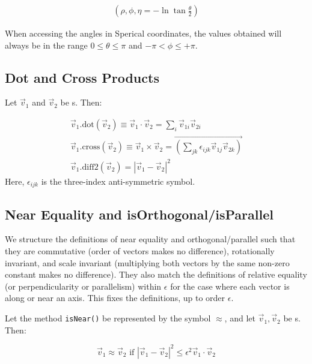 \begin{eqnarray}
  \left( \rho, \phi, \eta = - \ln { \tan { \frac {\theta}{2} } } \right)
  \label{eq:spherical}
\end{eqnarray}

When accessing the angles in Sperical coordinates, the values obtained will
always be in the range  $0 \leq \theta \leq \pi$ and $-\pi < \phi \leq +\pi$. 


\subsection {Dot and Cross Products}

\noindent
Let $\vec{v}_{1}$ and $\vec{v}_{2}$ be \SV s.  Then:

\begin{eqnarray}
  \vec{v}_{1}.\mbox{dot} (\vec{v}_{2}) \equiv
    \vec{v}_{1} \cdot \vec{v}_{2} = \sum_{i} \vec{v}_{1i} \vec{v}_{2i}
    \label{eq:dot} \\
  \vec{v}_{1}.\mbox{cross} (\vec{v}_{2}) \equiv
    \vec{v}_{1} \times \vec{v}_{2} = \stackrel{\longrightarrow} 
	{ {\textstyle \left( 
		\sum_{jk} \epsilon_{ijk} \vec{v}_{1j} \vec{v}_{2k} \right) } }
    \label{eq:cross} \\
  \vec{v}_{1}.\mbox{diff2} (\vec{v}_{2}) =
    \left| \vec{v}_{1} - \vec{v}_{2} \right| ^ 2 \label{eq:diff2}
\end{eqnarray}
\noindent
Here, $\epsilon_{ijk}$ is the three-index anti-symmetric symbol.


\subsection {Near Equality and isOrthogonal/isParallel}

\noindent
We structure the definitions of near equality and orthogonal/parallel such that
they are commutative (order of vectors makes no difference), rotationally
invariant, and scale invariant (multiplying both vectors by the same non-zero
constant makes no difference).  They also match the definitions of relative
equality (or perpendicularity or parallelism) within $\epsilon$ for the case
where each vector is along or near an axis.  This fixes the definitions, up to
order $\epsilon$.

\noindent
Let the method {\tt isNear()} be represented by the symbol $\approx$,
and let $\vec{v}_{1}, \vec{v}_{2}$ be \SV s.
Then:

\begin{equation}
\label{vecisnear}
\vec{v}_{1} \approx \vec{v}_{2} \mbox{ if }
  \left| \vec{v}_{1} - \vec{v}_{2} \right| ^ 2
  \leq \epsilon^2 \vec{v}_{1} \cdot \vec{v}_{2}
  \label{eq:isNear}
\end{equation}

